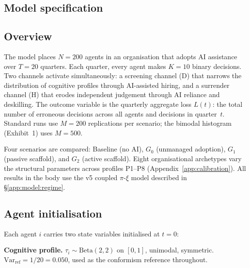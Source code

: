 \documentclass[11pt,a4paper]{article}
\begin{document}
\clearpage
\begin{appendices}
\renewcommand{\thefigure}{A\arabic{figure}}
\setcounter{figure}{0}
\renewcommand{\thetable}{A\arabic{table}}
\setcounter{table}{0}


\section{Model specification}\label{app:model}

\subsection{Overview}\label{app:model:overview}

The model places $N = 200$ agents in an organisation that adopts AI
assistance over $T = 20$ quarters. Each quarter, every agent makes $K = 10$
binary decisions. Two channels activate simultaneously: a screening channel
(D) that narrows the distribution of cognitive profiles through AI-assisted
hiring, and a surrender channel (H) that erodes independent judgement through
AI reliance and deskilling. The outcome variable is the quarterly aggregate
loss $L(t)$: the total number of erroneous decisions across all agents and
decisions in quarter~$t$. Standard runs use $M = 200$ replications per
scenario; the bimodal histogram (Exhibit~1) uses $M = 500$.

Four scenarios are compared: Baseline (no AI), $G_0$ (unmanaged adoption),
$G_1$ (passive scaffold), and $G_2$ (active scaffold). Eight organisational
archetypes vary the structural parameters across profiles P1--P8
(Appendix~\ref{app:calibration}). All results in the body use the v5 coupled
$\pi$-$\xi$ model described in \S\ref{app:model:regime}.

\subsection{Agent initialisation}\label{app:model:agents}

Each agent $i$ carries two state variables initialised at $t = 0$:

\textbf{Cognitive profile.}
$\tau_i \sim \mathrm{Beta}(2, 2)$ on $[0,1]$, unimodal, symmetric.
$\text{Var}_{\text{ref}} = 1/20 = 0.050$, used as the conformism reference
throughout.


\end{appendices}
\end{document}
